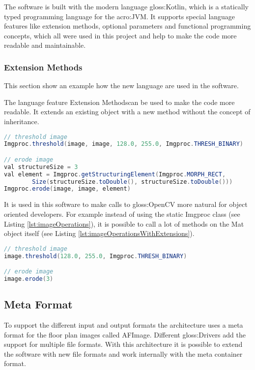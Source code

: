 The software is built with the modern language \gls{gloss:Kotlin}, which is a statically typed programming language for the \acrfull{acro:JVM}. It supports special language features like extension methods, optional parameters and functional programming concepts, which all were used in this project and help to make the code more readable and maintainable. \cite{kotlin}

\subsubsection{Extension Methods}
This section show an example how the new language are used in the software.

The language feature \flqq Extension Methods\frqq can be used to make the code more readable. It extends an existing object with a new method without the concept of inheritance.

\begin{lstlisting}[caption={Erode image without extension methods},label={lst:imageOperations},language=Java]
// threshold image
Imgproc.threshold(image, image, 128.0, 255.0, Imgproc.THRESH_BINARY)

// erode image
val structureSize = 3
val element = Imgproc.getStructuringElement(Imgproc.MORPH_RECT, 
        Size(structureSize.toDouble(), structureSize.toDouble()))
Imgproc.erode(image, image, element)
\end{lstlisting}

It is used in this software to make calls to \gls{gloss:OpenCV} more natural for object oriented developers. For example instead of using the static Imgproc class (see Listing \ref{lst:imageOperations}), it is possible to call a lot of methods on the Mat object itself (see Listing \ref{lst:imageOperationsWithExtensions}).

\begin{lstlisting}[caption={Erode image with extension methods},label={lst:imageOperationsWithExtensions},language=Java]
// threshold image
image.threshold(128.0, 255.0, Imgproc.THRESH_BINARY)

// erode image
image.erode(3)
\end{lstlisting}

\pagebreak

\subsection{Meta Format}
To support the different input and output formats the architecture uses a meta format for the
floor plan images called AFImage. Different \gls{gloss:Drivers}  add the support for multiple file formats. With this architecture it is possible to extend the software with new file formats and work internally with the meta container format.

